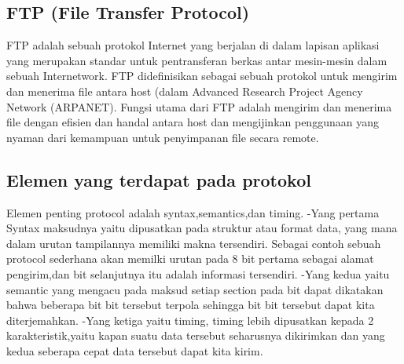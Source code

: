 \subsection{FTP (File Transfer Protocol)}
FTP adalah sebuah protokol Internet yang berjalan di dalam lapisan aplikasi yang merupakan standar untuk pentransferan berkas antar 
mesin-mesin dalam sebuah Internetwork. 
FTP didefinisikan sebagai sebuah protokol untuk mengirim dan menerima file antara host (dalam Advanced Research Project Agency Network 
(ARPANET). 
Fungsi utama dari FTP adalah mengirim dan menerima file dengan efisien dan handal antara host dan mengijinkan penggunaan yang nyaman 
dari kemampuan untuk penyimpanan file secara remote.

\subsection{Elemen yang terdapat pada protokol}
Elemen penting protocol adalah syntax,semantics,dan timing.
-Yang pertama Syntax maksudnya yaitu dipusatkan pada struktur atau format data, yang mana dalam urutan tampilannya memiliki makna 
tersendiri. Sebagai contoh sebuah protocol sederhana akan memilki urutan pada 8 bit pertama sebagai alamat pengirim,dan bit selanjutnya 
itu adalah informasi tersendiri. 
-Yang kedua yaitu semantic yang mengacu pada maksud setiap section pada bit dapat dikatakan bahwa beberapa bit bit tersebut terpola  
sehingga bit bit tersebut dapat  kita diterjemahkan.
-Yang ketiga yaitu timing, timing lebih dipusatkan kepada 2 karakteristik,yaitu  kapan suatu data tersebut seharusnya dikirimkan dan 
yang kedua seberapa cepat data tersebut dapat kita kirim.

